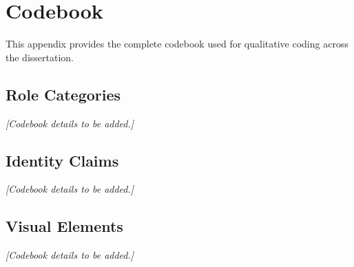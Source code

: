 \documentclass[../main.tex]{subfiles}
\begin{document}
\chapter{Codebook}

This appendix provides the complete codebook used for qualitative coding across the dissertation.

\section{Role Categories}

\textit{[Codebook details to be added.]}

\section{Identity Claims}

\textit{[Codebook details to be added.]}

\section{Visual Elements}

\textit{[Codebook details to be added.]}
\end{document}

